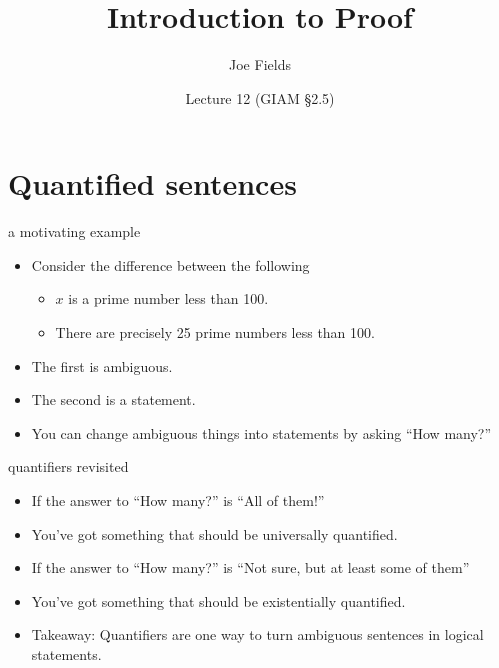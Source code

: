 \documentclass[landscape]{beamer}
\author{Joe Fields}
\title{Introduction to Proof}
\date{Lecture 12 (GIAM \S 2.5)}
\institute[SCSU]{ {\tt fieldsj1@southernct.edu} }
\begin{document}
\begin{frame}[plain]
  \titlepage
\end{frame}


\section{Quantified sentences}

\begin{frame}{a motivating example}
\begin{itemize}
\item Consider the difference between the following\pause
\begin{itemize}
\item $x$ is a prime number less than 100.\pause
\item There are precisely 25 prime numbers less than 100.\pause
\end{itemize}
\item The first is ambiguous.\pause
\item The second is a statement.\pause
\item You can change ambiguous things into statements by asking ``How many?''
\end{itemize}
\end{frame}

\begin{frame}{quantifiers revisited}
\begin{itemize}
\item If the answer to ``How many?'' is ``All of them!'' \pause
\item \hspace{.2in} You've got something that should be universally quantified.\pause
\item If the answer to ``How many?'' is ``Not sure, but at least some of them\textellipsis'' \pause
\item \hspace{.2in} You've got something that should be existentially quantified.\pause
\item Takeaway: Quantifiers are one way to turn ambiguous sentences in logical statements.
\end{itemize}
\end{frame}
\end{document}
